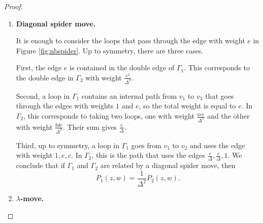 \documentclass[12pt,a4paper]{article}
\theoremstyle{definition}
\begin{document}
\begin{proof}
\begin{enumerate}[label=\Roman*.]
\begin{enumerate} [label=\arabic*.]
\begin{enumerate} [(a)]
            \item There is a double edge on $v_2$ (resp. $v_4$) with weight $c^2$ (resp. $d^2$). This gives two double edges on $v_1$ and $v_2$ (resp. $v_1$ and $v_4$) with weight $\frac{c^2}{\Delta}$ (resp. $\frac{d^2}{\Delta^2}$).
            \item There is a path from $v_2$ to $v_4$ in $\Gamma_1$ with weight $cd$. This corresponds to the path in $\Gamma_2$ from $v_2$ to $v_4$ and visits $v_1$ with total weight $\frac{cd}{\Delta^2}$.
        \end{enumerate}
        \item The vertex $v_1$ is not connected to any internal vertex. If there is a double edge adjacent to $v_3$, then this case is analogous to the cases $3(b)$ and $3(c)$. If $v_3$ is not internally connected, then it is analogous to the case $3(a)$. Finally, if there is a path between $v_3$ and $v_2$, or between $v_3$ and $v_4$, then it is analogous to the case $1(b)$
    \end{enumerate}

    \item \textbf{Diagonal spider move.}

    It is enough to consider the loops that pass through the edge with weight $e$ in Figure \ref{fig:nbspider}. Up to symmetry, there are three cases. 
    
    First, the edge $e$ is contained in the double edge of $\Gamma_1$. This corresponds to the double edge in $\Gamma_2$ with weight $\frac{e^2}{\Delta^2}$. 
    
    Second, a loop in $\Gamma_1$ contains an internal path from $v_1$ to $v_3$ that goes through the edges with weights $1$ and $e$, so the total weight is equal to $e$. In $\Gamma_2$, this corresponds to taking two loops, one with weight $\frac{ace}{\Delta^3}$ and the other with weight $\frac{bde}{\Delta^3}$. Their sum gives $\frac{e}{\Delta}$. 
    
    Third, up to symmetry, a loop in $\Gamma_1$ goes from $v_1$ to $v_2$ and uses the edge with weight $1, e, c$. In $\Gamma_2$, this is the path that uses the edges $\frac{c}{\Delta}, \frac{e}{\Delta}, 1$. We conclude that if $\Gamma_1$ and $\Gamma_2$ are related by a diagonal spider move, then \[P_1(z,w) = \frac{1}{\Delta^2} P_2(z,w).\]

    \item \textbf{$\lambda$-move.}


\end{enumerate}
\end{proof}
\end{document}
